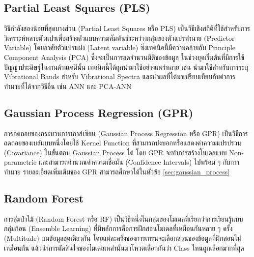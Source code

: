 \subsection{Partial Least Squares (PLS)}
\label{ssec:pls}

วิธีกำลังสองน้อยที่สุดบางส่วน (Partial Least Squares หรือ PLS) เป็นวิธีเชิงสถิติที่ใช้สำหรับการวิเคราะห์หลายตัวแปรเพื่อสร้างตัวแบบความสัมพันธ์ระหว่างกลุ่มของตัวแปรทำนาย (Predictor Variable) โดยอาศัยตัวแปรแฝง (Latent variable) ซึ่งเทคนิคนี้มีความคล้ายกับ Principle Component Analysis (PCA) ซึ่งจะเป็นการลดจำนวนมิติของข้อมูล\autocite{wold1984} ในช่วงยุคเริ่มต้นที่มีการใช้ปัญญาประดิษฐ์ในงานด้านเคมีนั้น เทคนิคนี้ได้ถูกนำมาใช้อย่างแพร่หลาย เช่น นำมาใช้สำหรับการระบุ Vibrational Bands สำหรับ Vibrational Spectra และนำผลที่ได้มาเปรียบเทียบกับค่าการทำนายที่ได้จากวิธีอื่น เช่น ANN และ PCA-ANN

\subsection{Gaussian Process Regression (GPR)}
\label{ssec:gpr}

การถดถอยของกระบวนการเกาส์เซียน (Gaussian Process Regression หรือ GPR) เป็นวิธีการถดถอยของเบส์แบบหนึ่งโดยใช้ Kernel Function ที่สามารถบ่งบอกหรือแสดงค่าความแปรปรวน (Covariance) ในขั้นตอน Gaussian Process ได้\autocite{rasmussen2005} โดย GPR จะทำการสร้างโมเดลแบบ Non-parametric และสามารถคำนวณค่าความเชื่อมั่น (Confidence Intervals) ไปพร้อม ๆ กับการทำนาย รายละเอียดเพิ่มเติมของ GPR สามารถศึกษาได้ในหัวข้อ \ref{sec:gaussian_process}

\subsection{Random Forest}
\label{ssec:rs}

การสุ่มป่าไม้ (Random Forest หรือ RF) เป็นวิธีหนึ่งในกลุ่มของโมเดลที่เรียกว่าการเรียนรู้แบบกลุ่มก้อน (Ensemble Learning) ที่มีหลักการคือการฝึกสอนโมเดลที่เหมือนกันหลาย ๆ ครั้ง (Multitude) บนข้อมูลชุดเดียวกัน โดยแต่ละครั้งของการเทรนจะเลือกส่วนของข้อมูลที่ฝึกสอนไม่เหมือนกัน แล้วนำการตัดสินใจของโมเดลเหล่านั้นมาโหวตเลือกกันว่า Class ไหนถูกเลือกมากที่สุด\autocite{breiman2001,quinlan1986}

